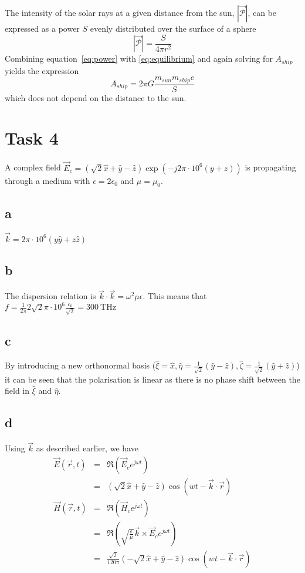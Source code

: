 \documentclass[12pt,a4paper]{article}
\begin{document}
The intensity of the solar rays at a given distance from the sun, $|\vec{\mathcal{P}}|$, can be expressed as a power $S$ evenly distributed over the surface of a sphere
\begin{equation}
  |\vec{\mathcal{P}}|=\frac{S}{4\pi r^2}
  \label{eq:power}
\end{equation}
Combining equation~\ref{eq:power} with \ref{eq:equilibrium} and again solving for $A_{ship}$ yields the expression
\begin{equation}
  A_{ship}=2\pi G\frac{m_{sun}m_{ship}c}{S}
\end{equation}
which does not depend on the distance to the sun.

\section{Task 4}
A complex field $\vec{E}_c=(\sqrt{2}\hat{x}+\hat{y}-\hat{z})\exp(-j2\pi\cdot 10^{6}(y+z))$ is propagating through a medium with $\epsilon=2\epsilon_0$ and $\mu=\mu_0$.
\subsection{a}
$\vec{k}=2\pi\cdot 10^{6}(y\hat{y}+z\hat{z})$
\subsection{b}
The dispersion relation is $\vec{k}\cdot\vec{k}=\omega^2\mu\epsilon$. This means that $f=\frac{1}{2\pi}2\sqrt{2}\pi\cdot 10^{6}\frac{c_0}{\sqrt{2}}=\SI{300}{\tera\hertz}$
\subsection{c}
By introducing a new orthonormal basis ($\hat{\xi}=\hat{x}, \hat{\eta}=\frac{1}{\sqrt{2}}(\hat{y}-\hat{z}), \hat{\zeta}=\frac{1}{\sqrt{2}}(\hat{y}+\hat{z})$) it can be seen that the polarisation is linear as there is no phase shift between the field in $\hat{\xi}$ and $\hat{\eta}$.

\subsection{d}
Using $\vec{k}$ as described earlier, we have
\begin{equation}
  \begin{array}{lcl}
    \vec{E}(\vec{r}, t) & = & \Re(\vec{E}_ce^{j\omega t}) \\
                        & = &(\sqrt{2}\hat{x}+\hat{y}-\hat{z})\cos(wt-\vec{k}\cdot\vec{r}) \\
    \vec{H}(\vec{r}, t) & = & \Re(\vec{H}_ce^{j\omega t}) \\
                        & = & \Re(\sqrt{\frac{\epsilon}{\mu}}\vec{k}\times\vec{E}_ce^{j\omega t}) \\
                        & = & \frac{\sqrt{2}}{120\pi}(-\sqrt{2}\hat{x}+\hat{y}-\hat{z})\cos(wt-\vec{k}\cdot\vec{r})
  \end{array}
\end{equation}
\end{document}
